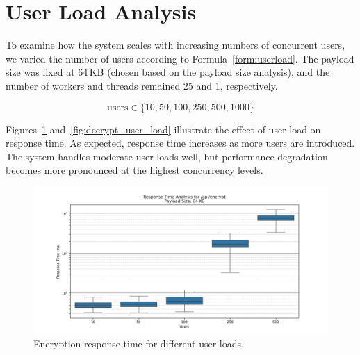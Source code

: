 \documentclass[cic,tc,english]{iiufrgs}
\numberwithin{algorithm}{chapter}
\begin{document}
        \section{User Load Analysis}
        \label{subsec:user_load_analysis}

            To examine how the system scales with increasing numbers of concurrent users, we varied the number of users according to Formula~\ref{form:userload}. The payload size was fixed at 64\,KB (chosen based on the payload size analysis), and the number of workers and threads remained 25 and 1, respectively.

            \begin{equation}
            \label{form:userload}
                \text{users} \in \{10, 50, 100, 250, 500, 1000\}
            \end{equation}

            Figures~\ref{fig:encrypt_user_load} and~\ref{fig:decrypt_user_load} illustrate the effect of user load on response time. As expected, response time increases as more users are introduced. The system handles moderate user loads well, but performance degradation becomes more pronounced at the highest concurrency levels.

            \begin{figure}
                \centering
                \includegraphics[width=\textwidth]{images/phase3/response_time_api_encrypt_64KB.png}
                \caption{Encryption response time for different user loads.}
                \label{fig:encrypt_user_load}
            \end{figure}
\end{document}
